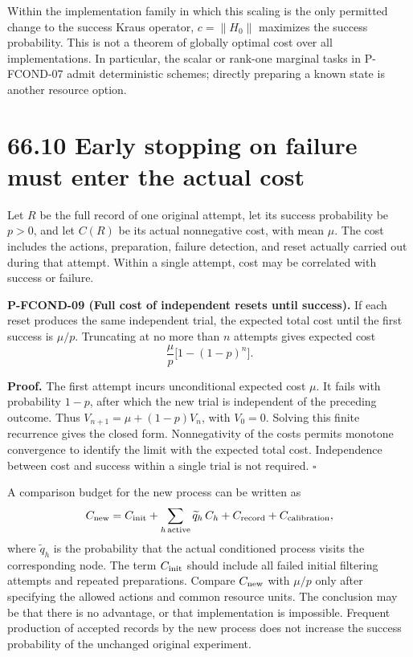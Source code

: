 \documentclass[
  11pt,
  oneside]{book}
\begin{document}
Within the implementation family in which this scaling is the only
permitted change to the success Kraus operator, \(c=\|H_0\|\) maximizes
the success probability. This is not a theorem of globally optimal cost
over all implementations. In particular, the scalar or rank-one marginal
tasks in P-FCOND-07 admit deterministic schemes; directly preparing a
known state is another resource option.

\section{66.10 Early stopping on failure must enter the actual cost}

Let \(R\) be the full record of one original attempt, let its success
probability be \(p>0\), and let \(C(R)\) be its actual nonnegative cost,
with mean \(\mu\). The cost includes the actions, preparation, failure
detection, and reset actually carried out during that attempt. Within a
single attempt, cost may be correlated with success or failure.

\label{p-fcond-09}{} \textbf{P-FCOND-09 (Full cost of
independent resets until success).} If each reset produces the same
independent trial, the expected total cost until the first success is
\(\mu/p\). Truncating at no more than \(n\) attempts gives expected cost
\[
\frac{\mu}{p}\bigl[1-(1-p)^n\bigr].
\]

\textbf{Proof.} The first attempt incurs unconditional expected cost
\(\mu\). It fails with probability \(1-p\), after which the new trial is
independent of the preceding outcome. Thus \(V_{n+1}=\mu+(1-p)V_n\),
with \(V_0=0\). Solving this finite recurrence gives the closed form.
Nonnegativity of the costs permits monotone convergence to identify the
limit with the expected total cost. Independence between cost and
success within a single trial is not required. \(\square\)

A comparison budget for the new process can be written as \[
C_{\rm new}=C_{\rm init}+\sum_{h\,\mathrm{active}}
 \widetilde q_h\,C_h+C_{\rm record}+C_{\rm calibration},
\] where \(\widetilde q_h\) is the probability that the actual
conditioned process visits the corresponding node. The term
\(C_{\rm init}\) should include all failed initial filtering attempts
and repeated preparations. Compare \(C_{\rm new}\) with \(\mu/p\) only
after specifying the allowed actions and common resource units. The
conclusion may be that there is no advantage, or that implementation is
impossible. Frequent production of accepted records by the new process
does not increase the success probability of the unchanged original
experiment.
\end{document}
